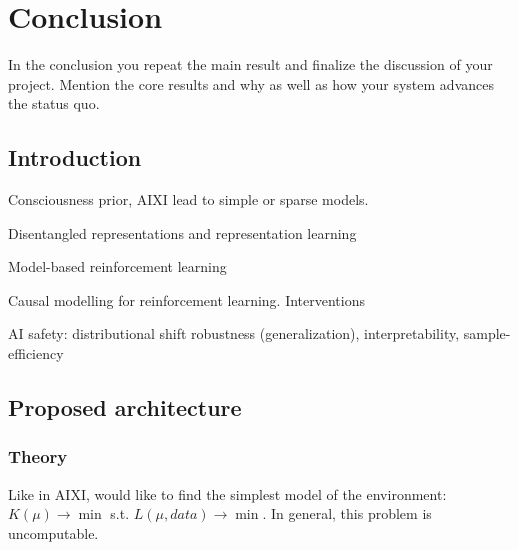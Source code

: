 \documentclass[a4paper,11pt,oneside]{report}
\begin{document}
\chapter{Conclusion}

In the conclusion you repeat the main result and finalize the discussion of
your project. Mention the core results and why as well as how your system
advances the status quo.

\cleardoublepage
{}
{}
\printbibliography

%
%

\section{Introduction}
Consciousness prior, AIXI lead to simple or sparse models.

Disentangled representations and representation learning

Model-based reinforcement learning

Causal modelling for reinforcement learning. Interventions

AI safety: distributional shift robustness (generalization), interpretability, sample-efficiency

\section{Proposed architecture}
\subsection{Theory}
Like in AIXI, would like to find the simplest model of the environment:
$K(\mu)\to\min$ s.t. $L(\mu, data)\to\min$. In general, this problem is uncomputable.
\end{document}
